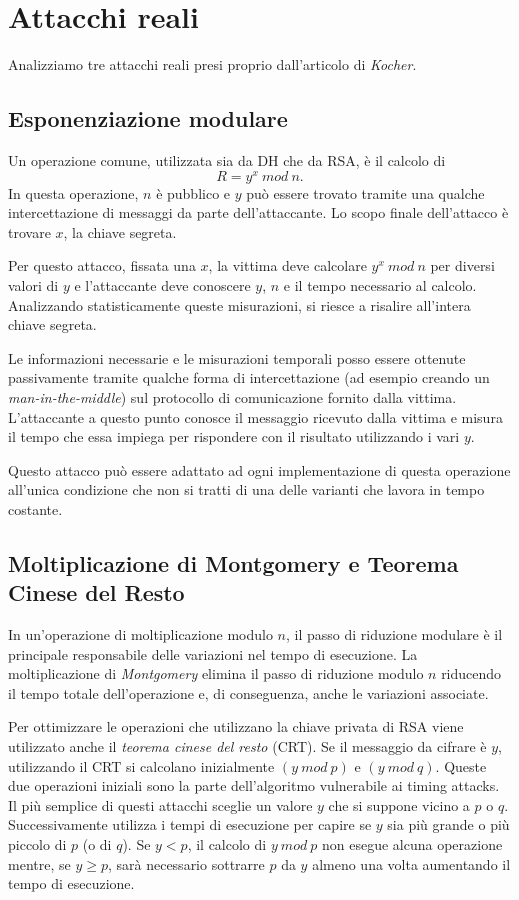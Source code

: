 	\section{Attacchi reali}
	
	Analizziamo tre attacchi reali presi proprio dall'articolo di \emph{Kocher}.
	
		\subsection{Esponenziazione modulare}
		Un operazione comune, utilizzata sia da \ac{DH} che da RSA, è il calcolo di $$R = y^{x} \ mod \ n.$$ In questa operazione, $n$ è pubblico e $y$ può essere trovato tramite una qualche intercettazione di messaggi da parte dell'attaccante. Lo scopo finale dell'attacco è trovare $x$, la chiave segreta.
		
		Per questo attacco, fissata una $x$, la vittima deve calcolare $y^{x} \ mod \ n$ per diversi valori di $y$ e l'attaccante deve conoscere $y$, $n$ e il tempo necessario al calcolo.
		Analizzando statisticamente queste misurazioni, si riesce a risalire all'intera chiave segreta.
		
		Le informazioni necessarie e le misurazioni temporali posso essere ottenute passivamente tramite qualche forma di intercettazione (ad esempio creando un \emph{man-in-the-middle}) sul protocollo di comunicazione fornito dalla vittima. L'attaccante a questo punto conosce il messaggio ricevuto dalla vittima e misura il tempo che essa impiega per rispondere con il risultato utilizzando i vari $y$.
		
		Questo attacco può essere adattato ad ogni implementazione di questa operazione all'unica condizione che non si tratti di una delle varianti che lavora in tempo costante.
		
		\subsection{Moltiplicazione di Montgomery e Teorema Cinese del Resto}
		In un'operazione di moltiplicazione modulo $n$, il passo di riduzione modulare è il principale responsabile delle variazioni nel tempo di esecuzione. La moltiplicazione di \emph{Montgomery}\cite{montgomery1985modular} elimina il passo di riduzione modulo $n$ riducendo il tempo totale dell'operazione e, di conseguenza, anche le variazioni associate.
		
		Per ottimizzare le operazioni che utilizzano la chiave privata di RSA viene utilizzato anche il \emph{teorema cinese del resto} (\ac{CRT}). Se il messaggio da cifrare è $y$, utilizzando il \ac{CRT} si calcolano inizialmente $(y \ mod \ p)$ e $(y \ mod \ q)$. Queste due operazioni iniziali sono la parte dell'algoritmo vulnerabile ai timing attacks. Il più semplice di questi attacchi sceglie un valore $y$ che si suppone vicino a $p$ o $q$. Successivamente utilizza i tempi di esecuzione per capire se $y$ sia più grande o più piccolo di $p$ (o di $q$). Se $y < p$, il calcolo di $y \ mod \ p$ non esegue alcuna operazione mentre, se $y \geq p$, sarà necessario sottrarre $p$ da $y$ almeno una volta aumentando il tempo di esecuzione.
		
